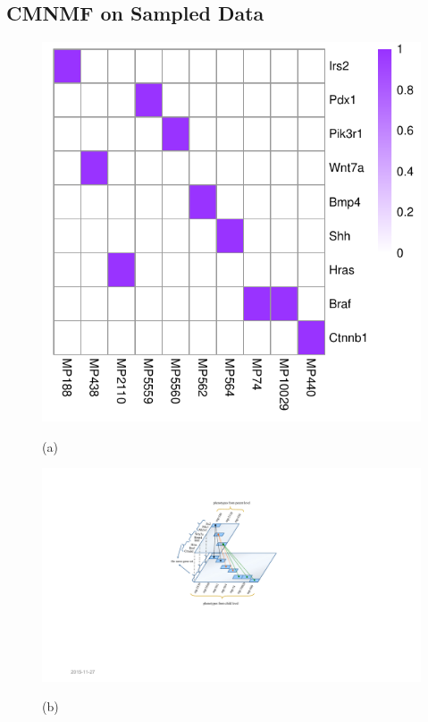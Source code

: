 \documentclass{bmcart}
\begin{document}
\subsection*{\textbf{CMNMF on Sampled Data}}
\begin{figure}[!h]
  \centering
  \begin{minipage}[b]{.40\linewidth}
   \includegraphics[width=\linewidth]{DrawPictures/v_4.pdf}
    \centerline{(a)}
  \end{minipage}
   \begin{minipage}[b]{.45\linewidth}
   \includegraphics[width=\linewidth]{DrawPictures/Hierarchica.pdf}
    \centerline{(b)}
  \end{minipage}

\end{figure}
\end{document}
